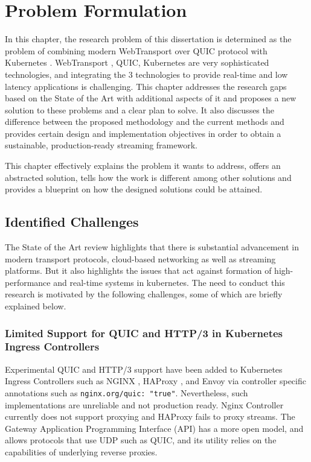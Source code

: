
\chapter{Problem Formulation}

In this chapter, the research problem of this dissertation is determined as the problem of combining modern WebTransport over QUIC protocol \cite{rfc9000} with Kubernetes \cite{kubernetes-docs}. WebTransport \cite{webtransport-draft}, QUIC, Kubernetes are very sophisticated technologies, and integrating the 3 technologies to provide real-time and low latency applications is challenging. This chapter addresses the research gaps based on the State of the Art with additional aspects of it and proposes a new solution to these problems and a clear plan to solve. It also discusses the difference between the proposed methodology and the current methods and provides certain design and implementation objectives in order to obtain a sustainable, production-ready streaming framework.

This chapter effectively explains the problem it wants to address, offers an abstracted solution, tells how the work is different among other solutions and provides a blueprint on how the designed solutions could be attained.

\section{Identified Challenges}
The State of the Art review highlights that there is substantial advancement in modern transport protocols, cloud-based networking as well as streaming platforms. But it also highlights the issues that act against formation of high-performance and real-time systems in kubernetes. The need to conduct this research is motivated by the following challenges, some of which are briefly explained below.

\subsection{Limited Support for QUIC and HTTP/3 in Kubernetes Ingress Controllers}
Experimental QUIC and HTTP/3 support have been added to Kubernetes Ingress Controllers such as NGINX \cite{nginx-ingress-docs}, HAProxy \cite{haproxy-docs}, and Envoy \cite{envoy-proxy} via controller specific annotations such as \texttt{nginx.org/quic: "true"}. Nevertheless, such implementations are unreliable and not production ready. Nginx Controller currently does not support proxying and HAProxy fails to proxy streams. The Gateway Application Programming Interface (API) \cite{gateway-api} has a more open model, and allows protocols that use UDP such as QUIC, and its utility relies on the capabilities of underlying reverse proxies.

